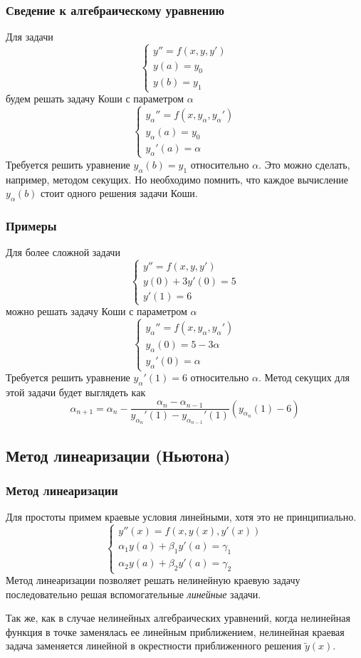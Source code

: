 \documentclass[professionalfonts,compress,unicode,aspectratio=169]{beamer}
\begin{document}
\begin{frame}\frametitle{Сведение к алгебраическому уравнению}
	Для задачи
	\[\begin{cases}
		y'' = f(x, y, y')\\
		y(a) = y_0\\
		y(b) = y_1
	\end{cases}\]
	будем решать задачу Коши с параметром $\alpha$
	\[\begin{cases}
		y_{\alpha}'' = f(x, y_{\alpha}, y_{\alpha}')\\
		y_{\alpha}(a) = y_0\\
		y_{\alpha}'(a) = \alpha
	\end{cases}\]
	Требуется решить уравнение $y_{\alpha}(b) = y_1$ относительно $\alpha$. 
	Это можно сделать, например, методом секущих. Но необходимо помнить, что
	каждое вычисление $y_{\alpha}(b)$ 
	стоит одного решения задачи Коши.
\end{frame}

\begin{frame}\frametitle{Примеры}
	Для более сложной задачи
	\[\begin{cases}
		y'' = f(x, y, y')\\
		y(0) + 3y'(0)= 5\\
		y'(1) = 6
	\end{cases}\]
	можно решать задачу Коши с параметром $\alpha$
	\[\begin{cases}
		y_{\alpha}'' = f(x, y_{\alpha}, y_{\alpha}')\\
		y_{\alpha}(0) = 5 - 3 \alpha\\
		y_{\alpha}'(0) = \alpha
	\end{cases}\]
	Требуется решить уравнение $y_{\alpha}'(1) = 6$ относительно $\alpha$. 
	Метод секущих для этой задачи будет выглядеть как
	\[
	\alpha_{n+1} = \alpha_n - \frac{\alpha_{n} - \alpha_{n-1}}{y_{\alpha_n}'(1)
	- y_{\alpha_{n-1}}'(1)} \left(y_{\alpha_n}(1) - 6\right)
	\]
\end{frame}

\subsection{Метод линеаризации (Ньютона)}
\begin{frame}\frametitle{Метод линеаризации}
	Для простоты примем краевые условия линейными, хотя это не принципиально.
	\[\begin{cases}
	y''(x) = f(x, y(x), y'(x))\\
	\alpha_1 y(a) + \beta_1 y'(a) = \gamma_1\\
	\alpha_2 y(a) + \beta_2 y'(a) = \gamma_2
	\end{cases}\]
	Метод линеаризации позволяет решать нелинейную краевую задачу последовательно решая
	вспомогательные \emph{линейные} задачи.

	Так же, как в случае нелинейных алгебраических уравнений, когда нелинейная функция
	в точке заменялась ее линейным приближением, нелинейная краевая задача заменяется 
	линейной в окрестности приближенного решения $\tilde{y}(x)$.
\end{frame}
\end{document}
